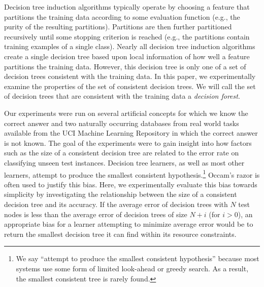 Decision tree induction algorithms
\cite{breiman84,quinlan86,fayyad92} typically operate
by choosing a feature that partitions the training data according to
some evaluation function (e.g., the purity of the resulting
partitions).  Partitions are then further partitioned recursively until
some stopping criterion is reached (e.g., the partitions contain
training examples of a single class). Nearly all decision tree
induction algorithms create a single decision tree based upon local
information of how well a feature partitions the training data.
However, this decision tree is only one of a set of decision trees
consistent with the training data.  In this paper, we experimentally
examine the properties of the set of consistent decision trees.  We
will call the set of decision trees that are consistent with the training
data a {\it decision forest}.

Our experiments were run on several artificial concepts for which
we know the correct answer and two naturally occurring databases from
real world tasks available from the UCI Machine Learning Repository
\cite{murphy} in which the correct answer is not known. The goal of
the experiments were to gain insight into how factors such as
the size of a consistent decision tree are related to the error rate
on classifying unseen test instances.  Decision tree learners, as well
as most other learners, attempt to produce the smallest consistent
hypothesis.\footnote{We say ``attempt to produce the smallest
consistent hypothesis'' because most systems use some form of limited
look-ahead or greedy search. As a result, the smallest consistent tree
is rarely found.} Occam's razor is often used to justify this bias.
Here, we experimentally evaluate this bias towards simplicity by
investigating the relationship between the size of a
consistent decision tree and its accuracy.  If the
average error of decision trees with $N$ test nodes is less than the
average error of decision trees of size $N+i$ (for $i>0$), an
appropriate bias for a learner attempting to minimize average error
would be to return the smallest decision tree it can find within its
resource constraints.

